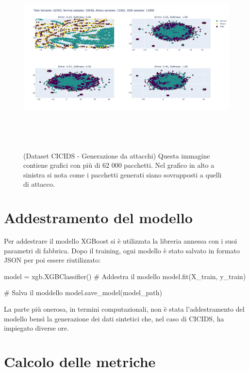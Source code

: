 \begin{figure}[htpb]
    \centering
    \includegraphics[width=\textwidth,height=10cm,keepaspectratio=true]{img/gen_test/cicids/CICIDS18_attack_only_12k.png}
    \caption{
      (Dataset CICIDS - Generazione da attacchi) Questa immagine contiene grafici con più di 62 000 pacchetti. Nel grafico in alto a sinistra si nota come i pacchetti generati siano sovrapposti a quelli di attacco.
    }
    \label{fig:gen_CICIDS_attack_1}
\end{figure}


\section{Addestramento del modello}

Per addestrare il modello XGBoost si è utilizzata la libreria annessa con i suoi parametri di fabbrica. Dopo il training, ogni modello è stato salvato in formato JSON per poi essere riutilizzato:

\begin{python}
model = xgb.XGBClassifier()
# Addestra il modello
model.fit(X_train, y_train)

# Salva il moddello
model.save_model(model_path)
\end{python}

La parte più onerosa, in termini computazionali, non è stata l'addestramento del modello bensì la generazione dei dati sintetici che, nel caso di CICIDS, ha impiegato diverse ore.

\section{Calcolo delle metriche}

